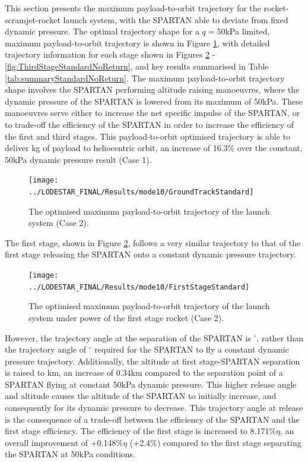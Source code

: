 This section presents the maximum payload-to-orbit trajectory for the rocket-scramjet-rocket launch system, with the SPARTAN able to deviate from fixed dynamic pressure. 
The optimal trajectory shape for a $q=$50kPa limited, maximum payload-to-orbit trajectory is shown in Figure \ref{fig:GroundTrackStandardNoReturn}, with detailed trajectory information for each stage shown in Figures \ref{fig:FirstStageStandardNoReturn} - \ref{fig:ThirdStageStandardNoReturn}, and key results summarised in Table \ref{tab:summaryStandardNoReturn}. The maximum payload-to-orbit trajectory shape involves the SPARTAN performing altitude raising manoeuvres, where the dynamic pressure of the SPARTAN is lowered from its maximum of 50kPa. These manoeuvres serve either to increase the net specific impulse of the SPARTAN, or to trade-off the efficiency of the SPARTAN in order to increase the efficiency of the first and third stages. 
This payload-to-orbit optimised trajectory is able to deliver \PayloadToOrbitStandardNoReturn kg of payload to heliocentric orbit, an increase of 16.3\% over the constant, 50kPa dynamic pressure result (Case 1).

\begin{figure}[ht!]
	
	
	
	\centering
	\texttt{[image: ../LODESTAR\_FINAL/Results/mode10/GroundTrackStandard]}
	\caption{The optimised maximum payload-to-orbit trajectory of the launch system (Case 2).}
	\label{fig:GroundTrackStandardNoReturn}
\end{figure}


The first stage, shown in Figure \ref{fig:FirstStageStandardNoReturn}, follows a very similar trajectory to that of the first stage releasing the SPARTAN onto a constant dynamic pressure trajectory.
\begin{figure}[ht!]
	\centering
	\texttt{[image: ../LODESTAR\_FINAL/Results/mode10/FirstStageStandard]}
	\caption{The optimised maximum payload-to-orbit trajectory of the launch system under power of the first stage rocket (Case 2).}
	\label{fig:FirstStageStandardNoReturn}
\end{figure}
 However, the trajectory angle at the separation of the SPARTAN is \secondthirdSeparationgammaqStandardNoReturn$^\circ$, rather than the trajectory angle of \secondthirdSeparationgammaConstqNoReturn$^\circ$ required for the SPARTAN to fly a constant dynamic pressure trajectory. Additionally, the altitude at first stage-SPARTAN separation is raised to \firstsecondSeparationAltStandardNoReturn km, an increase of 0.34km compared to the separation point of a SPARTAN flying at constant 50kPa dynamic pressure. This higher release angle and altitude causes the altitude of the SPARTAN to initially increase, and consequently for its dynamic pressure to decrease. This trajectory angle at release is the consequence of a trade-off between the efficiency of the SPARTAN and the first stage efficiency. The efficiency of the first stage is increased to 8.171\%$\eta$, an overall improvement of +0.148\%$\eta$ (+2.4\%) compared to the first stage separating the SPARTAN at 50kPa conditions. 
 
